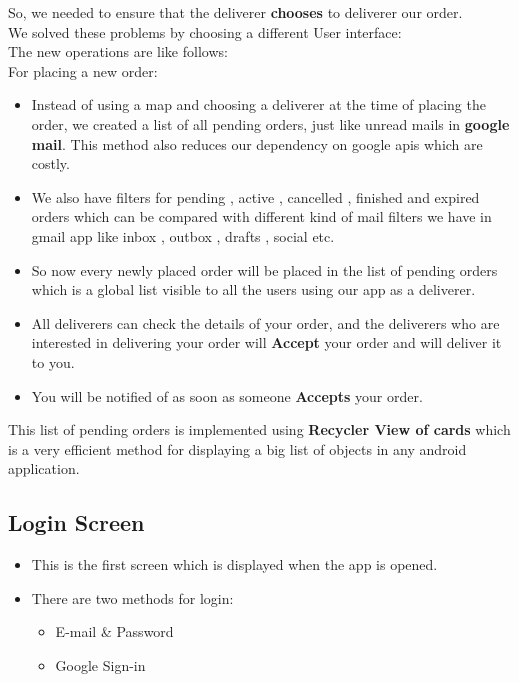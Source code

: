 \documentclass{report}
\begin{document}
So, we needed to ensure that the deliverer \textbf{chooses} to deliverer our order.\\
\newline
We solved these problems by choosing a different User interface:\\
The new operations are like follows:\\
For placing a new order:
\begin{itemize}
\item Instead of using a map and choosing a deliverer at the time of placing the order, we created a list of all pending orders, just like unread mails in \textbf{google mail}. This method also reduces our dependency on google apis which are costly.
\item We also have filters for pending , active , cancelled , finished and expired orders which can be compared with different kind of mail filters we have in gmail app like inbox , outbox , drafts , social etc.
\item So now every newly placed order will be placed in the list of pending orders which is a global list visible to all the users using our app as a deliverer.
\item All deliverers can check the details of your order, and the deliverers who are interested in delivering your order will \textbf{Accept} your order and will deliver it to you.
\item You will be notified of  as soon as someone \textbf{Accepts} your order.
\end{itemize}
This list of pending orders is implemented using \textbf{Recycler View of cards} which is a very efficient method for displaying a big list of objects in any android application.

\subsection{Login Screen}
\begin{itemize}
\item This is the first screen which is displayed when the app is opened.
\item There are two methods for login:
\begin{itemize}[label=$\rightarrow$]
\item E-mail \& Password
\item Google Sign-in
\end{itemize}
\end{itemize}
\end{document}
